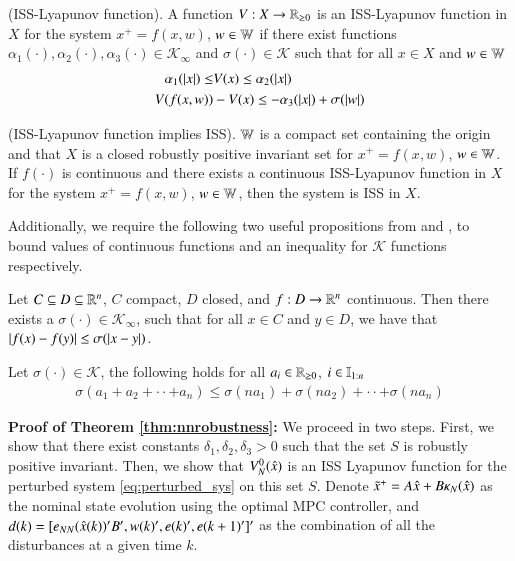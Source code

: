 \documentclass[preprint,5p, twocolumn, authoryear]{elsarticle}
\begin{document}
\begin{definition} \label{def:iss_lyapunov_func} (ISS-Lyapunov function). A
function $V : X \rightarrow \mathbb{R}_{\geq 0}$ is an ISS-Lyapunov function in $X$
for the system $x^+ = f(x, w)$, $w \in \mathbb{W}$ if there exist functions
$\alpha_1(\cdot), \alpha_2(\cdot), \alpha_3(\cdot) \in \mathcal{K}_{\infty}$ and
$\sigma(\cdot) \in \mathcal{K}$ such that for all $x \in X$ and $w \in \mathbb{W}$
\begin{align*}
    \alpha_1(\left| x \right|) \leq & V(x) \leq \alpha_2(\left| x \right|) \\
    V(f(x, w)) &- V(x) \leq -\alpha_3(\left| x \right|) + \sigma(\left| w \right|)
\end{align*}
\end{definition}

\begin{prop} \label{prop:lyapunov_implies_iss} (ISS-Lyapunov function implies
ISS). $\mathbb{W}$ is a compact set containing the origin and that $X$ is a closed
robustly positive invariant set for $x^+ = f(x, w)$, $w \in \mathbb{W}$. If $f(\cdot)$
is continuous and there exists a continuous ISS-Lyapunov function in $X$ for the
system $x^+ = f(x, w)$, $w \in \mathbb{W}$, then the system is ISS in $X$.
\end{prop}

Additionally, we require the following two useful propositions from
\cite*{allan:bates:risbeck:rawlings:2017} and \cite*{rawlings:ji:2012}, to bound
values of continuous functions and an inequality for $\mathcal{K}$ functions
respectively.

\begin{prop} \label{prop:continuous_funcs} Let $C \subseteq D \subseteq \mathbb{R}^n$,
    $C$ compact, $D$ closed, and $f : D \rightarrow \mathbb{R}^n$ continuous.  
    Then there exists a $\sigma(\cdot) \in \mathcal{K}_{\infty}$, such that for
    all $x \in C$ and $y \in D$, we have that $\left| f(x) - f(y) \right| \leq
    \sigma(\left| x-y \right|)$.
\end{prop}
    
\begin{prop} \label{prop:Kfunction_inequality} Let $\sigma(\cdot) \in
    \mathcal{K}$, the following holds for all $a_i \in \mathbb{R}_{\geq 0}$, $i \in
    \mathbb{I}_{1:n}$ 
    \begin{align*}
        \sigma(a_1 + a_2 + \cdot \cdot + a_n) \leq \sigma(na_1) + 
        \sigma(na_2) + \cdot \cdot + \sigma(na_n)
    \end{align*}    
\end{prop}

\textbf{Proof of Theorem \ref{thm:nnrobustness}:}
We proceed in two steps. First, we show that there exist constants $\delta_1,
\delta_2, \delta_3 > 0$ such that the set $S$ is robustly positive invariant.
Then, we show that $V_N^0(\hat{x})$ is an ISS Lyapunov function for the perturbed
system \eqref{eq:perturbed_sys} on this set $S$. Denote $\tilde{x}^+ = A\hat{x} +
B\kappa_N(\hat{x})$ as the nominal state evolution using the optimal MPC
controller, and $d(k) = [ e_{NN}(\hat{x}(k))'B', w(k)', e(k)', e(k+1)']'$ as the
combination of all the disturbances at a given time $k$. 
\end{document}
